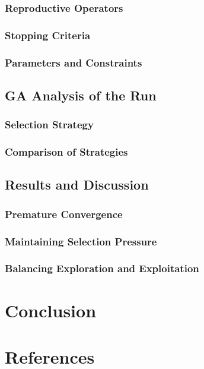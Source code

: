 \documentclass[conference]{inc/IEEEtran}
\begin{document}
\subsubsection{Reproductive Operators}

\subsubsection{Stopping Criteria}

\subsubsection{Parameters and Constraints}
\subsection{GA Analysis of the Run}

\subsubsection{Selection Strategy}

\subsubsection{Comparison of Strategies}
\subsection{Results and Discussion}

\subsubsection{Premature Convergence}

\subsubsection{Maintaining Selection Pressure}

\subsubsection{Balancing Exploration and Exploitation}

\section{Conclusion}

\section*{References}




\end{document}
